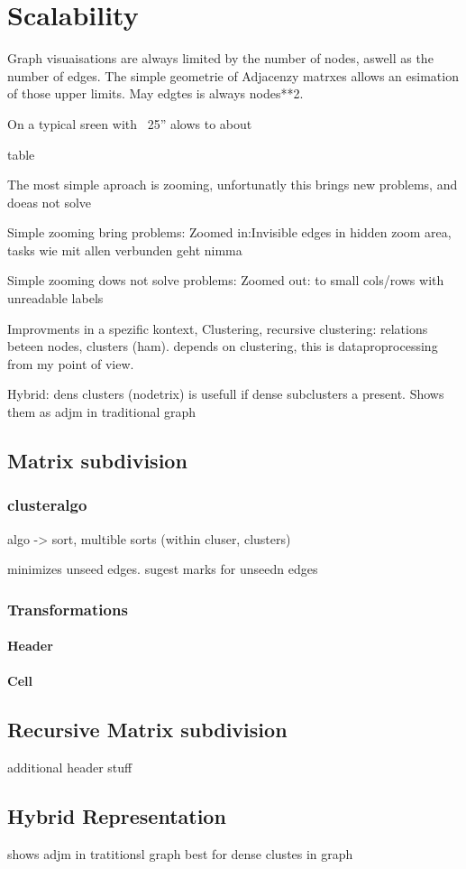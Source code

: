 \chapter{Scalability}
\label{chap:Scalability}


Graph visuaisations are always limited by the number of nodes, aswell as the number of edges. 
The simple geometrie of Adjacenzy matrxes allows an esimation of those upper limits. May edgtes is always nodes**2.

On a typical sreen with ~25” alows to  about 

table

The most simple
 aproach is zooming, unfortunatly this brings new problems, and doeas not solve

Simple zooming bring problems:
Zoomed in:Invisible edges in hidden zoom area, tasks wie mit allen verbunden geht nimma

Simple zooming dows not solve problems:
Zoomed out: to small cols/rows with unreadable labels

Improvments in a spezific kontext, 
Clustering, recursive clustering: relations beteen nodes, clusters (ham). depends on clustering, this is dataproprocessing from my point of view.

Hybrid: dens clusters (nodetrix) is usefull if dense subclusters a present. Shows them as adjm in traditional graph



\section{Matrix subdivision}

\subsection{clusteralgo}
algo -> sort,
multible sorts (within cluser, clusters)

minimizes unseed edges. sugest marks for unseedn edges

\subsection{Transformations}
\subsubsection{Header}
\subsubsection{Cell}





\section{Recursive Matrix subdivision}

additional header stuff





\section{Hybrid Representation}

shows adjm in tratitionsl graph
best for dense clustes in graph
